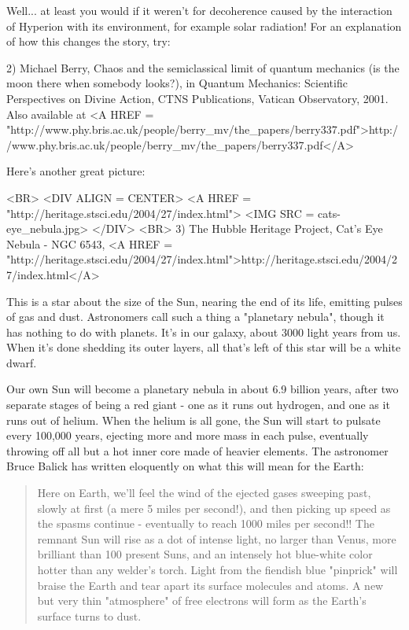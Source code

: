 Well... at least you would if it weren't for decoherence caused by the 
interaction of Hyperion with its environment, for example solar radiation!
For an explanation of how this changes the story, try:

2) Michael Berry, Chaos and the semiclassical limit of quantum mechanics
(is the moon there when somebody looks?), in Quantum Mechanics: Scientific
Perspectives on Divine Action, CTNS Publications, Vatican Observatory, 2001.
Also available at 
<A HREF = "http://www.phy.bris.ac.uk/people/berry_mv/the_papers/berry337.pdf">http://www.phy.bris.ac.uk/people/berry_mv/the_papers/berry337.pdf</A>

Here's another great picture:

<BR>
<DIV ALIGN = CENTER>
<A HREF = "http://heritage.stsci.edu/2004/27/index.html">
<IMG SRC = cats-eye_nebula.jpg>
</DIV>
<BR>
3) The Hubble Heritage Project, Cat's Eye Nebula - NGC 6543, 
<A HREF = "http://heritage.stsci.edu/2004/27/index.html">http://heritage.stsci.edu/2004/27/index.html</A>

This is a star about the size of the Sun, nearing the end of its life, 
emitting pulses of gas and dust.  Astronomers call such a thing a 
"planetary nebula", though it has nothing to do with planets.  It's in our 
galaxy, about 3000 light years from us.  When it's done shedding its outer
layers, all that's left of this star will be a white dwarf.

Our own Sun will become a planetary nebula in about 6.9 billion years,
after two separate stages of being a red giant - one as it runs out
hydrogen, and one as it runs out of helium.  When the helium is all gone,
the Sun will start to pulsate every 100,000 years, ejecting more and more 
mass in each pulse, eventually throwing off all but a hot inner core made
of heavier elements.  The astronomer Bruce Balick has written eloquently 
on what this will mean for the Earth:

\begin{quote}
    Here on Earth, we'll feel the wind of the ejected gases sweeping 
    past, slowly at first (a mere 5 miles per second!), and then 
    picking up speed as the spasms continue - eventually to reach 
    1000 miles per second!!  The remnant Sun will rise as a dot of 
    intense light, no larger than Venus, more brilliant than 100 
    present Suns, and an intensely hot blue-white color hotter than 
    any welder's torch.  Light from the fiendish blue "pinprick" 
    will braise the Earth and tear apart its surface molecules and 
    atoms.  A new but very thin "atmosphere" of free electrons 
    will form as the Earth's surface turns to dust.
\end{quote}

